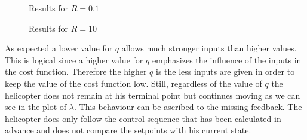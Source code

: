 \begin{figure}[h]
	\centering
	\caption{Results for $R=0.1$}
	\label{fig:problem2plots_q_0.1}
\end{figure}

\begin{figure}[h]
	\centering
	\caption{Results for $R=10$}
	\label{fig:problem2plots_q_10}
\end{figure}

As expected a lower value for $q$ allows much stronger inputs than higher values. This is logical since a higher value for $q$ emphasizes the influence of the inputs in the cost function. Therefore the higher $q$ is the less inputs are given in order to keep the value of the cost function low. Still, regardless of the value of $q$ the helicopter does not remain at his terminal point but continues moving as we can see in the plot of $\lambda$. This behaviour can be ascribed to the missing feedback. The helicopter does only follow the control sequence that has been calculated in advance and does not compare the setpoints with his current state. 



